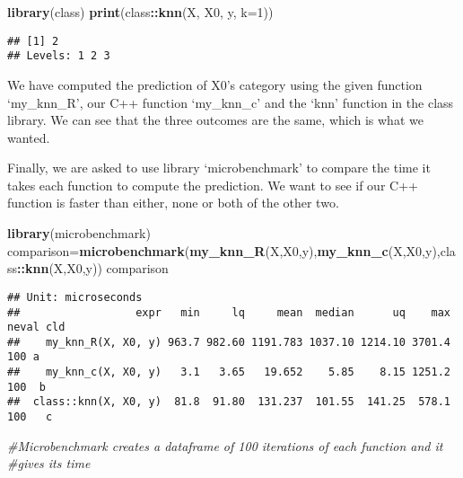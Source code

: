 \documentclass[
]{article}
\newenvironment{Shaded}{\begin{snugshade}}{\end{snugshade}}
\newcommand{\AttributeTok}[1]{\textcolor[rgb]{0.13,0.29,0.53}{#1}}
\newcommand{\CommentTok}[1]{\textcolor[rgb]{0.56,0.35,0.01}{\textit{#1}}}
\newcommand{\DecValTok}[1]{\textcolor[rgb]{0.00,0.00,0.81}{#1}}
\newcommand{\FunctionTok}[1]{\textcolor[rgb]{0.13,0.29,0.53}{\textbf{#1}}}
\newcommand{\NormalTok}[1]{#1}
\newcommand{\OtherTok}[1]{\textcolor[rgb]{0.56,0.35,0.01}{#1}}
\newcommand{\SpecialCharTok}[1]{\textcolor[rgb]{0.81,0.36,0.00}{\textbf{#1}}}
\begin{document}
\begin{Shaded}
\begin{Highlighting}[]
\FunctionTok{library}\NormalTok{(class)}
\FunctionTok{print}\NormalTok{(class}\SpecialCharTok{::}\FunctionTok{knn}\NormalTok{(X, X0, y, }\AttributeTok{k=}\DecValTok{1}\NormalTok{))}
\end{Highlighting}
\end{Shaded}

\begin{verbatim}
## [1] 2
## Levels: 1 2 3
\end{verbatim}

We have computed the prediction of X0's category using the given
function `my\_knn\_R', our C++ function `my\_knn\_c' and the `knn'
function in the class library. We can see that the three outcomes are
the same, which is what we wanted.

Finally, we are asked to use library `microbenchmark' to compare the
time it takes each function to compute the prediction. We want to see if
our C++ function is faster than either, none or both of the other two.

\begin{Shaded}
\begin{Highlighting}[]
\FunctionTok{library}\NormalTok{(microbenchmark)}
\NormalTok{comparison}\OtherTok{=}\FunctionTok{microbenchmark}\NormalTok{(}\FunctionTok{my\_knn\_R}\NormalTok{(X,X0,y),}\FunctionTok{my\_knn\_c}\NormalTok{(X,X0,y),class}\SpecialCharTok{::}\FunctionTok{knn}\NormalTok{(X,X0,y))}
\NormalTok{comparison}
\end{Highlighting}
\end{Shaded}

\begin{verbatim}
## Unit: microseconds
##                  expr   min     lq     mean  median      uq    max neval cld
##    my_knn_R(X, X0, y) 963.7 982.60 1191.783 1037.10 1214.10 3701.4   100 a  
##    my_knn_c(X, X0, y)   3.1   3.65   19.652    5.85    8.15 1251.2   100  b 
##  class::knn(X, X0, y)  81.8  91.80  131.237  101.55  141.25  578.1   100   c
\end{verbatim}

\begin{Shaded}
\begin{Highlighting}[]
\CommentTok{\#Microbenchmark creates a dataframe of 100 iterations of each function and it }
\CommentTok{\#gives its time}
\end{Highlighting}
\end{Shaded}
\end{document}
